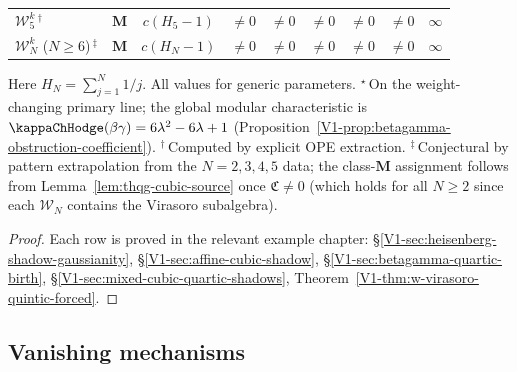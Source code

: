 \begin{theorem}
\begin{center}
\begin{tabular}{l@{\;\;}c@{\;\;}c@{\;\;}c@{\;\;}c@{\;\;}c@{\;\;}c@{\;\;}c@{\;\;}c}
$\mathcal{W}_5^k$\,$^\dagger$ &
 $\mathbf{M}$ & $c(H_5{-}1)$ &
 $\neq 0$ & $\neq 0$ & $\neq 0$ & $\neq 0$ &
 $\neq 0$ & $\infty$ \\
$\mathcal{W}_N^k$ ($N \geq 6$)\,$^\ddagger$ &
 $\mathbf{M}$ & $c(H_N{-}1)$ &
 $\neq 0$ & $\neq 0$ & $\neq 0$ & $\neq 0$ &
 $\neq 0$ & $\infty$ \\
\bottomrule
\end{tabular}
\end{center}
Here $H_N = \sum_{j=1}^N 1/j$. All values for generic parameters.
${}^\star$\,On the weight-changing primary line; the global
modular characteristic is $\kappaChHodge(\beta\gamma) = 6\lambda^2 - 6\lambda + 1$
(Proposition~\ref{V1-prop:betagamma-obstruction-coefficient}).
${}^\dagger$\,Computed by explicit OPE extraction.
${}^\ddagger$\,Conjectural by pattern extrapolation from
the $N = 2, 3, 4, 5$ data; the class-$\mathbf{M}$ assignment
follows from Lemma~\ref{lem:thqg-cubic-source} once
$\mathfrak{C} \neq 0$ (which holds for all $N \geq 2$
since each $\mathcal{W}_N$ contains the Virasoro subalgebra).
\end{theorem}

\begin{proof}
Each row is proved in the relevant example chapter:
\S\ref{V1-sec:heisenberg-shadow-gaussianity},
\S\ref{V1-sec:affine-cubic-shadow},
\S\ref{V1-sec:betagamma-quartic-birth},
\S\ref{V1-sec:mixed-cubic-quartic-shadows},
Theorem~\ref{V1-thm:w-virasoro-quintic-forced}.
\end{proof}



\subsection{Vanishing mechanisms}

